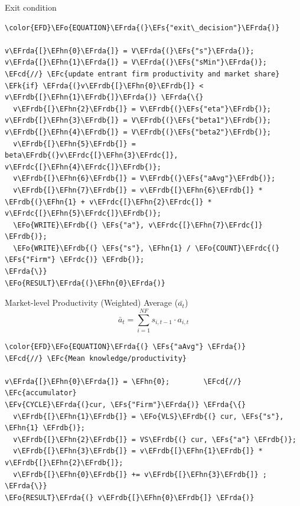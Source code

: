 \documentclass[bigger,aspectratio=169]{beamer}
\newcommand{\EFc}[1]{\textcolor{EFc}{#1}} %
\newcommand{\EFcd}[1]{\textcolor{EFcd}{#1}} %
\newcommand{\EFs}[1]{\textcolor{EFs}{#1}} %
\newcommand{\EFk}[1]{\textcolor{EFk}{#1}} %
\newcommand{\EFv}[1]{\textcolor{EFv}{#1}} %
\newcommand{\EFo}[1]{\textcolor{EFo}{#1}} %
\newcommand{\EFhn}[1]{\textcolor{EFhn}{\textbf{#1}}} %
\newcommand{\EFrda}[1]{\textcolor{EFrda}{#1}} %
\newcommand{\EFrdb}[1]{\textcolor{EFrdb}{#1}} %
\newcommand{\EFrdc}[1]{\textcolor{EFrdc}{#1}} %
\begin{document}
\begin{frame}[label={sec:orgb17ae92},fragile]{Exit condition}
 \begin{Code}
\begin{Verbatim}
\color{EFD}\EFo{EQUATION}\EFrda{(}\EFs{"exit\_decision"}\EFrda{)}

v\EFrda{[}\EFhn{0}\EFrda{]} = V\EFrda{(}\EFs{"s"}\EFrda{)}; v\EFrda{[}\EFhn{1}\EFrda{]} = V\EFrda{(}\EFs{"sMin"}\EFrda{)};
\EFcd{//} \EFc{update entrant firm productivity and market share}
\EFk{if} \EFrda{(}v\EFrdb{[}\EFhn{0}\EFrdb{]} < v\EFrdb{[}\EFhn{1}\EFrdb{]}\EFrda{)} \EFrda{\{}
  v\EFrdb{[}\EFhn{2}\EFrdb{]} = V\EFrdb{(}\EFs{"eta"}\EFrdb{)}; v\EFrdb{[}\EFhn{3}\EFrdb{]} = V\EFrdb{(}\EFs{"beta1"}\EFrdb{)}; v\EFrdb{[}\EFhn{4}\EFrdb{]} = V\EFrdb{(}\EFs{"beta2"}\EFrdb{)};
  v\EFrdb{[}\EFhn{5}\EFrdb{]} = beta\EFrdb{(}v\EFrdc{[}\EFhn{3}\EFrdc{]}, v\EFrdc{[}\EFhn{4}\EFrdc{]}\EFrdb{)};
  v\EFrdb{[}\EFhn{6}\EFrdb{]} = V\EFrdb{(}\EFs{"aAvg"}\EFrdb{)};
  v\EFrdb{[}\EFhn{7}\EFrdb{]} = v\EFrdb{[}\EFhn{6}\EFrdb{]} * \EFrdb{(}\EFhn{1} + v\EFrdc{[}\EFhn{2}\EFrdc{]} * v\EFrdc{[}\EFhn{5}\EFrdc{]}\EFrdb{)};
  \EFo{WRITE}\EFrdb{(} \EFs{"a"}, v\EFrdc{[}\EFhn{7}\EFrdc{]} \EFrdb{)};
  \EFo{WRITE}\EFrdb{(} \EFs{"s"}, \EFhn{1} / \EFo{COUNT}\EFrdc{(} \EFs{"Firm"} \EFrdc{)} \EFrdb{)};
\EFrda{\}}
\EFo{RESULT}\EFrda{(}\EFhn{0}\EFrda{)}
\end{Verbatim}
\end{Code}
\end{frame}
\begin{frame}[label={sec:org3cc8fcc},fragile]{Market-level Productivity (Weighted) Average (\(\bar{a_{t}}\))}
 \begin{equation}
\bar{a}_{t} =  \sum_{i=1}^{NF} s_{i, t-1}\cdot a_{i,t}
\end{equation}


\begin{Code}
\begin{Verbatim}
\color{EFD}\EFo{EQUATION}\EFrda{(} \EFs{"aAvg"} \EFrda{)}
\EFcd{//} \EFc{Mean knowledge/productivity}

v\EFrda{[}\EFhn{0}\EFrda{]} = \EFhn{0};        \EFcd{//} \EFc{accumulator}
\EFv{CYCLE}\EFrda{(}cur, \EFs{"Firm"}\EFrda{)} \EFrda{\{}
  v\EFrdb{[}\EFhn{1}\EFrdb{]} = \EFo{VLS}\EFrdb{(} cur, \EFs{"s"}, \EFhn{1} \EFrdb{)};
  v\EFrdb{[}\EFhn{2}\EFrdb{]} = VS\EFrdb{(} cur, \EFs{"a"} \EFrdb{)};
  v\EFrdb{[}\EFhn{3}\EFrdb{]} = v\EFrdb{[}\EFhn{1}\EFrdb{]} * v\EFrdb{[}\EFhn{2}\EFrdb{]};
  v\EFrdb{[}\EFhn{0}\EFrdb{]} += v\EFrdb{[}\EFhn{3}\EFrdb{]} ;
\EFrda{\}}
\EFo{RESULT}\EFrda{(} v\EFrdb{[}\EFhn{0}\EFrdb{]} \EFrda{)}
\end{Verbatim}
\end{Code}
\end{frame}
\end{document}
